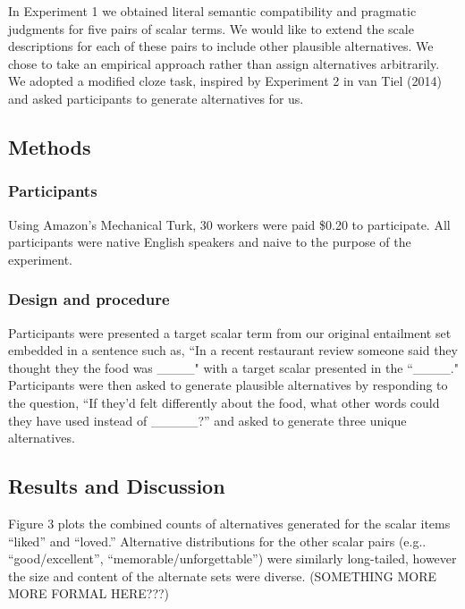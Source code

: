\documentclass[10pt, letterpaper]{article}
\begin{document}
In Experiment 1 we obtained literal semantic compatibility and pragmatic
judgments for five pairs of scalar terms. We would like to extend the
scale descriptions for each of these pairs to include other plausible
alternatives. We chose to take an empirical approach rather than assign
alternatives arbitrarily. We adopted a modified cloze task, inspired by
Experiment 2 in van Tiel (2014) and asked participants to generate
alternatives for us.

\subsection{Methods}\label{methods-1}

\subsubsection{Participants}\label{participants-1}

Using Amazon's Mechanical Turk, 30 workers were paid \$0.20 to
participate. All participants were native English speakers and naive to
the purpose of the experiment.

\subsubsection{Design and procedure}\label{design-and-procedure-1}

Participants were presented a target scalar term from our original
entailment set embedded in a sentence such as, ``In a recent restaurant
review someone said they thought they the food was \_\_\_\_" with a
target scalar presented in the ``\_\_\_\_." Participants were then asked
to generate plausible alternatives by responding to the question, ``If
they'd felt differently about the food, what other words could they have
used instead of \_\_\_\_\_?'' and asked to generate three unique
alternatives.

\subsection{Results and Discussion}\label{results-and-discussion-1}

Figure 3 plots the combined counts of alternatives generated for the
scalar items ``liked'' and ``loved.'' Alternative distributions for the
other scalar pairs (e.g.. ``good/excellent'',
``memorable/unforgettable'') were similarly long-tailed, however the
size and content of the alternate sets were diverse. (SOMETHING MORE
MORE FORMAL HERE???)
\end{document}
